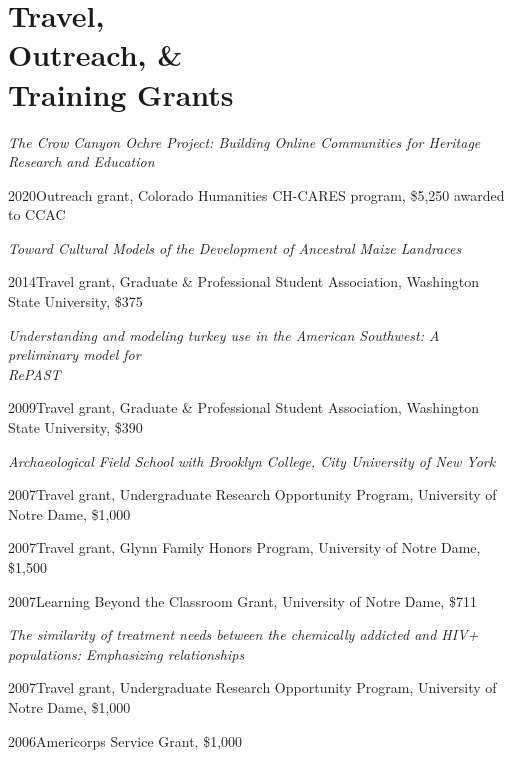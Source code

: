 \section{Travel, \\ Outreach, \& \\ Training Grants}

\emph{The Crow Canyon Ochre Project: Building Online Communities for Heritage Research and Education}
\begin{list1}
\item[] 2020\hspace{.2cm}Outreach grant, Colorado Humanities CH-CARES program, \$5,250 awarded to CCAC
\end{list1}


\emph{Toward Cultural Models of the Development of Ancestral Maize Landraces}
\begin{list1}
\item[] 2014\hspace{.2cm}Travel grant, Graduate \& Professional Student Association, Washington State University, \$375
\end{list1}


\emph{Understanding and modeling turkey use in the American Southwest: A preliminary model for \\RePAST}
\nopagebreak
\begin{list1}
\item[] 2009\hspace{.2cm}Travel grant, Graduate \& Professional Student Association, Washington State University, \$390
\end{list1}


\emph{Archaeological Field School with Brooklyn College, City University of New York}
\begin{list1}
\item[] 2007\hspace{.2cm}Travel grant, Undergraduate Research Opportunity Program, University of Notre Dame, \$1,000
\item[] 2007\hspace{.2cm}Travel grant, Glynn Family Honors Program, University of Notre Dame, \$1,500
\item[] 2007\hspace{.2cm}Learning Beyond the Classroom Grant, University of Notre Dame, \$711 
\end{list1}


\emph{The similarity of treatment needs between the chemically addicted and HIV+ populations: Emphasizing relationships}
\begin{list1}
\item[] 2007\hspace{.2cm}Travel grant, Undergraduate Research Opportunity Program, University of Notre Dame, \$1,000
\item[] 2006\hspace{.2cm}Americorps Service Grant, \$1,000
\end{list1}
